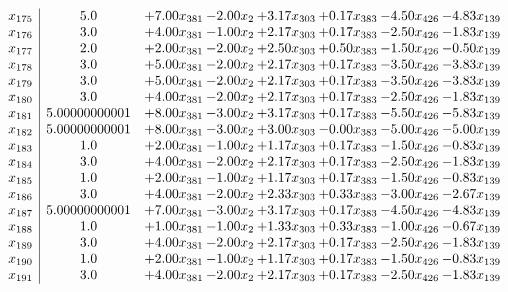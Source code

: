\documentclass[8pt]{article}
\begin{document}
\[\begin{array}{c| c c@{\hskip 2pt} c@{\hskip 2pt} c@{\hskip 2pt} c@{\hskip 2pt} c@{\hskip 2pt} c@{\hskip 2pt} }
 x_{175}   &  5.0 & +  7.00 x_{381} & -2.00 x_{2} & +  3.17 x_{303} & +  0.17 x_{383} & -4.50 x_{426} & -4.83 x_{139}\\
 x_{176}   &  3.0 & +  4.00 x_{381} & -1.00 x_{2} & +  2.17 x_{303} & +  0.17 x_{383} & -2.50 x_{426} & -1.83 x_{139}\\
 x_{177}   &  2.0 & +  2.00 x_{381} & -2.00 x_{2} & +  2.50 x_{303} & +  0.50 x_{383} & -1.50 x_{426} & -0.50 x_{139}\\
 x_{178}   &  3.0 & +  5.00 x_{381} & -2.00 x_{2} & +  2.17 x_{303} & +  0.17 x_{383} & -3.50 x_{426} & -3.83 x_{139}\\
 x_{179}   &  3.0 & +  5.00 x_{381} & -2.00 x_{2} & +  2.17 x_{303} & +  0.17 x_{383} & -3.50 x_{426} & -3.83 x_{139}\\
 x_{180}   &  3.0 & +  4.00 x_{381} & -2.00 x_{2} & +  2.17 x_{303} & +  0.17 x_{383} & -2.50 x_{426} & -1.83 x_{139}\\
 x_{181}   &  5.00000000001 & +  8.00 x_{381} & -3.00 x_{2} & +  3.17 x_{303} & +  0.17 x_{383} & -5.50 x_{426} & -5.83 x_{139}\\
 x_{182}   &  5.00000000001 & +  8.00 x_{381} & -3.00 x_{2} & +  3.00 x_{303} & -0.00 x_{383} & -5.00 x_{426} & -5.00 x_{139}\\
 x_{183}   &  1.0 & +  2.00 x_{381} & -1.00 x_{2} & +  1.17 x_{303} & +  0.17 x_{383} & -1.50 x_{426} & -0.83 x_{139}\\
 x_{184}   &  3.0 & +  4.00 x_{381} & -2.00 x_{2} & +  2.17 x_{303} & +  0.17 x_{383} & -2.50 x_{426} & -1.83 x_{139}\\
 x_{185}   &  1.0 & +  2.00 x_{381} & -1.00 x_{2} & +  1.17 x_{303} & +  0.17 x_{383} & -1.50 x_{426} & -0.83 x_{139}\\
 x_{186}   &  3.0 & +  4.00 x_{381} & -2.00 x_{2} & +  2.33 x_{303} & +  0.33 x_{383} & -3.00 x_{426} & -2.67 x_{139}\\
 x_{187}   &  5.00000000001 & +  7.00 x_{381} & -3.00 x_{2} & +  3.17 x_{303} & +  0.17 x_{383} & -4.50 x_{426} & -4.83 x_{139}\\
 x_{188}   &  1.0 & +  1.00 x_{381} & -1.00 x_{2} & +  1.33 x_{303} & +  0.33 x_{383} & -1.00 x_{426} & -0.67 x_{139}\\
 x_{189}   &  3.0 & +  4.00 x_{381} & -2.00 x_{2} & +  2.17 x_{303} & +  0.17 x_{383} & -2.50 x_{426} & -1.83 x_{139}\\
 x_{190}   &  1.0 & +  2.00 x_{381} & -1.00 x_{2} & +  1.17 x_{303} & +  0.17 x_{383} & -1.50 x_{426} & -0.83 x_{139}\\
 x_{191}   &  3.0 & +  4.00 x_{381} & -2.00 x_{2} & +  2.17 x_{303} & +  0.17 x_{383} & -2.50 x_{426} & -1.83 x_{139}\\

\end{array}\]
\end{document}
